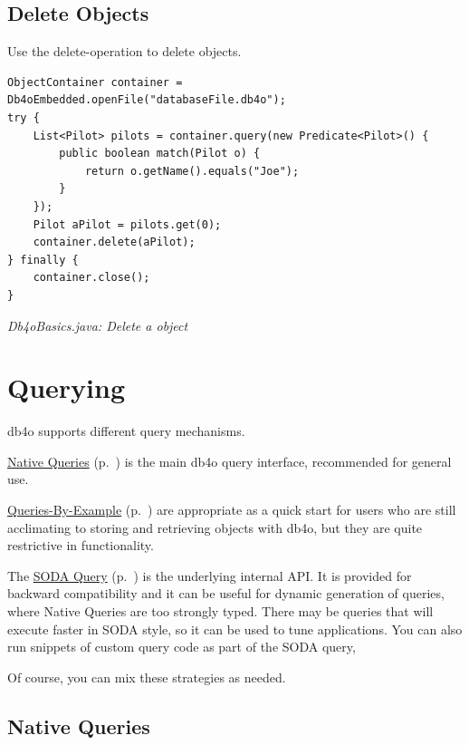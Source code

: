 \subsection{Delete Objects}
\label{ref:basics-object-container:deleteobjects}

Use the delete-operation to delete objects.

\begin{lstlisting}
ObjectContainer container = Db4oEmbedded.openFile("databaseFile.db4o");
try {
    List<Pilot> pilots = container.query(new Predicate<Pilot>() {
        public boolean match(Pilot o) {
            return o.getName().equals("Joe");
        }
    });
    Pilot aPilot = pilots.get(0);
    container.delete(aPilot);
} finally {
    container.close();
}
\end{lstlisting}

{\small\itshape Db4oBasics.java: Delete a object\par}
\medskip

\section{Querying}
\label{ref:basics-querying}

db4o supports different query mechanisms.

\hyperref[ref:basics-querying-native-queries]{Native Queries} (p.~\pageref{ref:basics-querying-native-queries}) is the main db4o query interface, recommended for general use.

\hyperref[ref:basics-querying-query-by-example]{Queries-By-Example} (p.~\pageref{ref:basics-querying-query-by-example}) are appropriate as a quick start for users who are still acclimating to storing and retrieving objects with db4o, but they are quite restrictive in functionality.

The \hyperref[ref:basics-querying-soda-query]{SODA Query} (p.~\pageref{ref:basics-querying-soda-query}) is the underlying internal API. It is provided for backward compatibility and it can be useful for dynamic generation of queries, where Native Queries are too strongly typed. There may be queries that will execute faster in SODA style, so it can be used to tune applications. You can also run snippets of custom query code as part of the SODA query,

Of course, you can mix these strategies as needed.

\subsection{Native Queries}
\label{ref:basics-querying-native-queries}

